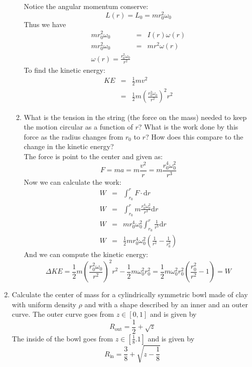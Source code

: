 \documentclass{article}
\newcommand{\de}{\mathrm{d}}
\begin{document}
\begin{enumerate}
\begin{enumerate}
            Notice the angular momentum conserve:
            \[
            L(r) = L_0 = mr_0^2 \omega_0
            \]
            Thus we have
            \begin{eqnarray*}
            mr_0^2 \omega_0 &=& I(r) \omega(r) \\
            mr_0^2 \omega_0 &=& mr^2 \omega(r) \\
            \omega(r) = \frac{r_0^2 \omega_0}{r^2}
            \end{eqnarray*}
            To find the kinetic energy:
            \begin{eqnarray*}
            KE &=& \frac{1}{2} m v^2\\
            &=& \frac{1}{2} m (\frac{r_0^2 \omega_0}{r^2})^2r^2
            \end{eqnarray*}
            \item What is the tension in the string (the force on the mass) needed to keep the motion circular as a function of $r$? What is the work done by this force as the radius changes from $r_0$ to $r$? How does this compare to the change in the kinetic energy?\\

            The force is point to the center and given as:
            \[
            F = ma = m \frac{v^2}{r} = m \frac{r_0^4 \omega_0^2}{r^3}
            \]
            Now we can calculate the work:
            \begin{eqnarray*}
            W &=& \int_{r_0}^r F \cdot \de r \\
            W &=& \int_{r_0}^r m \frac{r_0^4 \omega_0^2}{r^3} \de r \\
            W &=& mr_0^4\omega_0^2 \int_{r_0}^r \frac{1}{r^3} \de r \\
            W &=& \frac{1}{2}mr_0^4\omega_0^2 (\frac{1}{r^2} - \frac{1}{r_0^2})
            \end{eqnarray*}
            And we can compute the kinetic energy:
            \[
            \Delta KE = \frac{1}{2} m (\frac{r_0^2 \omega_0}{r^2})^2r^2 - \frac{1}{2} m \omega_0^2r_0^2 = \frac{1}{2}m \omega_0^2r_0^2(\frac{r_0^2}{r^2} - 1) = W
            \]
        \end{enumerate}
        \item Calculate the center of mass for a cylindrically symmetric bowl made of clay with uniform density $\rho$ and with a shape described by an inner and an outer curve. The outer curve goes from $z \in [0,1]$ and is given by
        \[
        R_\text{out} = \frac{1}{2} + \sqrt{z}
        \]
        The inside of the bowl goes from $z \in [\frac{1}{8}.1]$ and is given by
        \[
        R_\text{in} = \frac{3}{8} + \sqrt{z-\frac{1}{8}}
        \]\\


\end{enumerate}
\end{document}
